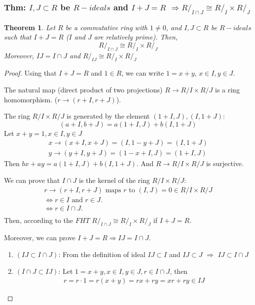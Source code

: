 \documentclass[11pt,a4paper]{article}
\newtheorem{theorem}{Theorem}
\begin{document}
\subsubsection{Thm: $I,J\subset R$ be $R-ideals$ and $I+J=R$ $\Rightarrow R/_{I\cap J} \cong R/_I\times R/_J$}
\begin{theorem}
Let $R$ be a commutative ring with $1\neq 0$, and $I,J\subset R$ be $R-ideals$ such that $I+J=R$ ($I$ and $J$ are relatively prime). Then,
$$R/_{I\cap J} \cong R/_I\times R/_J$$
Moreover, $IJ=I\cap J$ and $R/_{IJ} \cong R/_I\times R/_J$
\end{theorem}
\begin{proof}
    Using that $I+J=R$ and $1\in R$, we can write $1=x+y$, $x\in I,y\in J$.

    The natural map (direct product of two projections) $R \rightarrow	R/I\times R/J$ is a ring homomorphism. ($r \rightarrow (r+I,r+J)$).

    The ring $R/I\times R/J$ is generated by the element $(1+I,J),(I,1+J)$: $$(a+I,b+J)=a(1+I,J)+b(I,1+J)$$
    Let $x+y=1,x\in I,y\in J$
    \begin{equation}
        \begin{aligned}
            x \rightarrow (x+I,x+J)=(I,1-y+J)=(I,1+J)\\
            y \rightarrow (y+I,y+J)=(1-x+I,J)=(1+I,J)
        \end{aligned}
        \nonumber
    \end{equation}
    Then $bx+ay=a(1+I,J)+b(I,1+J)$. And $R \rightarrow R/I\times R/J$ is surjective.

    We can prove that $I\cap J$ is the kernel of the ring $R/I\times R/J$:
    \begin{equation}
        \begin{aligned}
            r \rightarrow (r+I,r+J)\text{ maps }r \text{ to }(I,J)=0\in R/I\times R/J\\
            \Leftrightarrow	r\in I\text{ and }r\in J.\\
            \Leftrightarrow	r\in I\cap J.\\
        \end{aligned}
        \nonumber
    \end{equation}
    Then, according to the $FHT$
    $R/_{I\cap J} \cong R/_I\times R/_J$ if $I+J=R$.

    Moreover, we can prove $I+J=R \Rightarrow IJ=I\cap J$.
    \begin{enumerate}
        \item $(IJ\subset I\cap J)$: From the definition of ideal $IJ\subset I$ and $IJ\subset J$ $\Rightarrow$ $IJ\subset I\cap J$
        \item $(I\cap J\subset IJ)$: Let $1=x+y,x\in I, y\in J, r\in I\cap J$, then
        \begin{equation}
            \begin{aligned}
                r=r\cdot 1=r(x+y)=rx+ry=xr+ry\in IJ
            \end{aligned}
            \nonumber
        \end{equation}
    \end{enumerate}
\end{proof}
\end{document}
